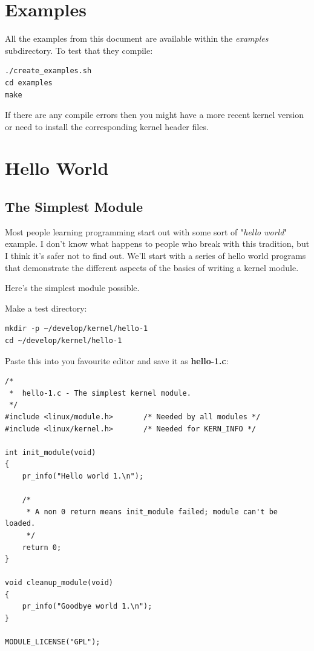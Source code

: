 \documentclass[11pt]{article}
\begin{document}
\section*{Examples}
\label{sec-3}
All the examples from this document are available within the \emph{examples} subdirectory. To test that they compile:

\begin{verbatim}
./create_examples.sh
cd examples
make
\end{verbatim}

If there are any compile errors then you might have a more recent kernel version or need to install the corresponding kernel header files.
\section*{Hello World}
\label{sec-4}
\subsection*{The Simplest Module}
\label{sec-4-1}
Most people learning programming start out with some sort of "\emph{hello world}" example. I don't know what happens to people who break with this tradition, but I think it's safer not to find out. We'll start with a series of hello world programs that demonstrate the different aspects of the basics of writing a kernel module.

Here's the simplest module possible.

Make a test directory:

\begin{verbatim}
mkdir -p ~/develop/kernel/hello-1
cd ~/develop/kernel/hello-1
\end{verbatim}

Paste this into you favourite editor and save it as \textbf{hello-1.c}:

\begin{verbatim}
/*
 *  hello-1.c - The simplest kernel module.
 */
#include <linux/module.h>       /* Needed by all modules */
#include <linux/kernel.h>       /* Needed for KERN_INFO */

int init_module(void)
{
    pr_info("Hello world 1.\n");

    /*
     * A non 0 return means init_module failed; module can't be loaded.
     */
    return 0;
}

void cleanup_module(void)
{
    pr_info("Goodbye world 1.\n");
}

MODULE_LICENSE("GPL");
\end{verbatim}
\end{document}

